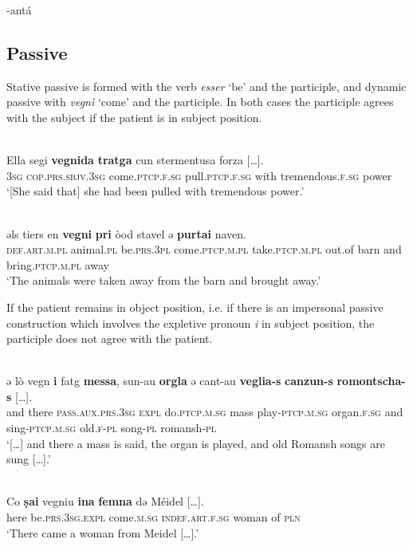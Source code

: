 -antá




\subsection{Passive}
Stative passive is formed with the verb \textit{esser} `be' and the participle, and dynamic passive with \textit{vegnì} ‘come’ and the participle. In both cases the participle agrees with the subject if the patient is in subject position. %

 \ea\label{}
\\
\gll Ella segi \textbf{vegnida} \textbf{tratga} cun stermentusa forza […].\\
     \textsc{3sg} \textsc{cop.prs.sbjv.3sg} come.\textsc{ptcp.f.sg} pull.\textsc{ptcp.f.sg} with tremendous.\textsc{f.sg} power\\
\glt `[She said that] she had been pulled with tremendous power.'
\z


\ea\label{ex:1:}
 {\citealt[53]{Büchli1966}}\\
\gll    ǝls tiers en \textbf{vegni} \textbf{pri} òod stavel ǝ \textbf{purtai} naven.\\
     \textsc{def.art.m.pl}  animal.\textsc{pl}  be.\textsc{prs.3pl}   come.\textsc{ptcp.m.pl}   take.\textsc{ptcp.m.pl}  out.of barn and bring.\textsc{ptcp.m.pl}  away\\
\glt `The animals were taken away from the barn and brought away.'
\z

If the patient remains in object position, i.e. if there is an impersonal passive construction which involves the expletive pronoun \textit{i} in subject position, the participle does not agree with the patient.


\ea\label{ex:1:}
 {\citealt[94]{Büchli1966}}\\
\gll    ǝ lò vegn \textbf{i} fatg \textbf{messa}, sun-au \textbf{orgla} ǝ cant-au \textbf{veglia-s} \textbf{canzun-s} \textbf{romontscha-s} […].\\
     and there \textsc{pass.aux.prs.3sg}  \textsc{expl}  do.\textsc{ptcp.m.sg} mass play-\textsc{ptcp.m.sg}  organ.\textsc{f.sg}  and sing-\textsc{ptcp.m.sg} old.\textsc{f}-\textsc{pl}   song-\textsc{pl} romansh-\textsc{pl}\\
\glt `[…] and there a mass is said, the organ is played, and old Romansh songs are sung […].'
\z


\ea\label{ex:1:}
\\
\gll    Co \textbf{ṣai} vegniu \textbf{ina} \textbf{femna} dǝ Méidel […].\\
     here be.\textsc{prs.3sg.expl} come.\textsc{m.sg}  \textsc{indef.art.f.sg} woman of  \textsc{pln} \\
\glt `There came a woman from Meidel […].'
\z


